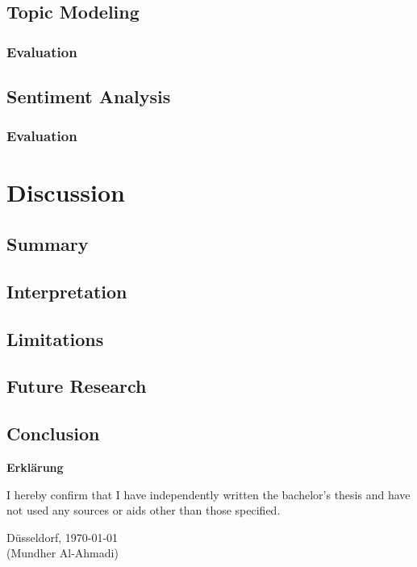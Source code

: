 \documentclass[12pt,english,titlepage,a4paper]{article}
\begin{document}
\subsection{Topic Modeling}
\subsubsection{Evaluation}
\subsection{Sentiment Analysis}
\subsubsection{Evaluation}


\section{Discussion}
\subsection{Summary}
\subsection{Interpretation}
\subsection{Limitations}
\subsection{Future Research}
\subsection{Conclusion}


\pagebreak





\pagebreak\noindent
\textbf{\LARGE Erkl\"arung}

\bigskip\bigskip
\noindent 
I hereby confirm that I have independently written the 
bachelor's thesis and have not used any sources or aids 
other than those specified.
\bigskip
\noindent

\bigskip\bigskip\bigskip
\noindent
D\"usseldorf, \today \\
(Mundher Al-Ahmadi)

% 
\end{document}
